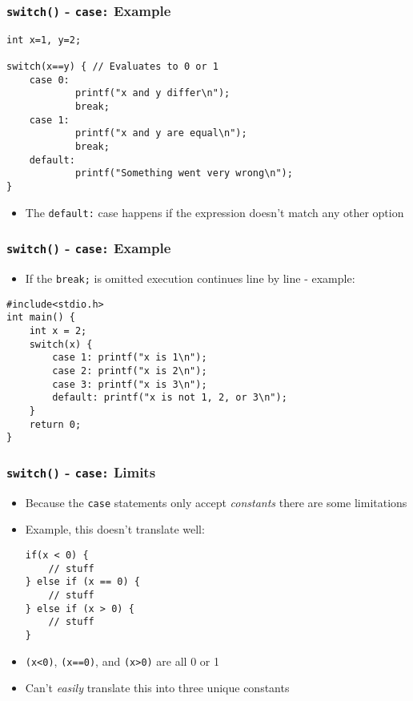 \documentclass[14pt]{beamer}
\begin{document}
\begin{frame}[fragile]
\frametitle{\texttt{switch()} - \texttt{case:} Example}
\begin{lstlisting}[style=CStyle]
int x=1, y=2;

switch(x==y) { // Evaluates to 0 or 1
	case 0:
			printf("x and y differ\n");
			break;
	case 1:
			printf("x and y are equal\n");
			break;
	default:
			printf("Something went very wrong\n");
}
\end{lstlisting}
\begin{itemize}
\item The \texttt{default:} case happens if the expression doesn't match any other option
\end{itemize}
\end{frame}

\begin{frame}[fragile]
\frametitle{\texttt{switch()} - \texttt{case:} Example}
\begin{itemize}
\item If the \texttt{break;} is omitted execution continues line by line - example:
\end{itemize}
\begin{lstlisting}[style=CStyle]
#include<stdio.h>
int main() {
	int x = 2;
	switch(x) {
		case 1: printf("x is 1\n");
		case 2: printf("x is 2\n");
		case 3: printf("x is 3\n");
		default: printf("x is not 1, 2, or 3\n");
	}
	return 0;
}
\end{lstlisting}
\end{frame}

\begin{frame}[fragile]
\frametitle{\texttt{switch()} - \texttt{case:} Limits}
\begin{itemize}
\item Because the \texttt{case} statements only accept \textit{constants} there are some limitations
\item Example, this doesn't translate well:
\begin{lstlisting}[style=CStyle]
if(x < 0) {
	// stuff
} else if (x == 0) {
	// stuff
} else if (x > 0) {
	// stuff
}
\end{lstlisting}
\item \texttt{(x<0)}, \texttt{(x==0)}, and \texttt{(x>0)} are all 0 or 1
\item Can't \textit{easily} translate this into three unique constants
\end{itemize}
\end{frame}
\end{document}
